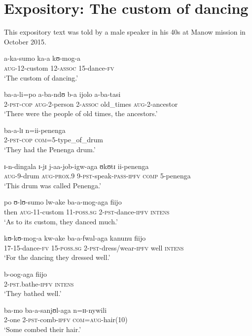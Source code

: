 \section{Expository: The custom of dancing}
This expository text was told by a male speaker in his 40s at Manow mission in October 2015.
\setcounter{equation}{0}
\begin{exe}
\ex \gll a-ka-sumo ka-a kʊ-mog-a\\
\textsc{aug}-12-custom 12-\textsc{assoc} 15-dance-\textsc{fv}\\
\glt \lq The custom of dancing.'

\ex \gll ba-a-li=po a-ba-ndʊ b-a ijolo a-ba-tasi\\
2-\textsc{pst}-\textsc{cop} \textsc{aug}-2-person 2-\textsc{assoc} old\_times \textsc{aug}-2-ancestor\\
\glt \lq There were the people of old times, the ancestors.'

\ex \gll ba-a-lɪ n=ii-penenga\\
2-\textsc{pst}-\textsc{cop} \textsc{com}=5-type\_of\_drum\\
\glt \lq They had the Penenga drum.'

\ex \gll ɪ-n-dingala ɪ-jɪ j-aa-job-igw-aga ʊkʊtɪ ii-penenga\\
\textsc{aug}-9-drum \textsc{aug}-\textsc{prox.9} 9-\textsc{pst}-speak-\textsc{pass}-\textsc{ipfv} \textsc{comp} 5-penenga\\
\glt \lq This drum was called Penenga.'

\ex \gll po ʊ-lʊ-sumo lw-ake ba-a-mog-aga fiijo\\
then \textsc{aug}-11-custom 11-\textsc{poss.sg} 2-\textsc{pst}-dance-\textsc{ipfv} \textsc{intens}\\
\glt \lq As to its custom, they danced much.'

\ex \gll kʊ-kʊ-mog-a kw-ake ba-a-fwal-aga kanunu fiijo\\
17-15-dance-\textsc{fv} 15-\textsc{poss.sg} 2-\textsc{pst}-dress/wear-\textsc{ipfv} well \textsc{intens}\\
\glt \lq For the dancing they dressed well.'

\ex \gll b-oog-aga fiijo\\
2-\textsc{pst}.bathe-\textsc{ipfv} \textsc{intens}\\
\glt \lq They bathed well.'

\ex \gll ba-mo ba-a-sanjʊl-aga n=ɪɪ-nywili\\
2-one 2-\textsc{pst}-comb-\textsc{ipfv} \textsc{com}=\textsc{aug}-hair(10)\\
\glt \lq Some combed their hair.'


\end{exe}
